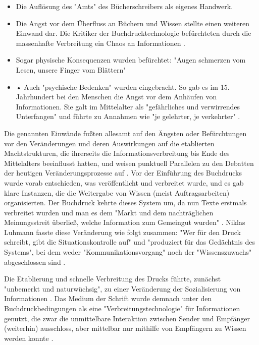 \begin{itemize}
\item Die Auflösung des "Amts" des Bücherschreibers als eigenes Handwerk.
\item Die Angst vor dem Überfluss an Büchern und Wissen stellte einen weiteren Einwand dar. Die Kritiker der Buchdrucktechnologie befürchteten  durch die massenhafte Verbreitung ein Chaos an Informationen \cite{giesecke_1991_buchdruck}.
\item Sogar physische Konsequenzen wurden befürchtet: "Augen schmerzen vom Lesen, unsere Finger vom Blättern" \cite{giesecke_1991_buchdruck}
\item •	Auch "psychische Bedenken" wurden eingebracht. So gab es im 15. Jahrhundert bei den Menschen die Angst vor dem Anhäufen von Informationen. Sie galt im Mittelalter als "gefährliches und verwirrendes Unterfangen" und führte zu Annahmen wie "je gelehrter, je verkehrter" \cite{giesecke_1991_buchdruck}.
\end{itemize}

Die genannten Einwände fußten allesamt auf den Ängsten oder Befürchtungen vor den Veränderungen und deren Auswirkungen auf die etablierten Machtstrukturen, die ihrerseits die Informationsverbreitung bis Ende des Mittelalters beeinflusst hatten, und weisen punktuell Parallelen zu den Debatten der heutigen Veränderungsprozesse auf \cite{hagner_2015_sache_buches}. Vor der Einführung des Buchdrucks wurde vorab entschieden, was veröffentlicht und verbreitet wurde, und es gab klare Instanzen, die die Weitergabe von Wissen (meist Auftragsarbeiten) organisierten. Der Buchdruck kehrte dieses System um, da nun Texte erstmals verbreitet wurden und man es dem "Markt und dem nachträglichen Meinungsstreit überließ, welche Information zum Gemeingut wurden" \cite{giesecke_1991_buchdruck}. Niklas Luhmann fasste diese Veränderung wie folgt zusammen: "Wer für den Druck schreibt, gibt die Situationskontrolle auf" und "produziert für das Gedächtnis des Systems", bei dem weder "Kommunikationsvorgang" noch der "Wissenszuwachs" abgeschlossen sind \cite{Luhmann1998}.

Die Etablierung und schnelle Verbreitung \cite{stober_2014_pressegeschichte} des Drucks führte, zunächst "unbemerkt und naturwüchsig", zu einer Veränderung der Sozialisierung von Informationen \cite{giesecke_1991_buchdruck}. Das Medium der Schrift wurde demnach unter den Buchdruckbedingungen als eine "Verbreitungstechnologie" für Informationen genutzt, die zwar die unmittelbare Interaktion zwischen Sender und Empfänger (weiterhin) ausschloss, aber mittelbar nur mithilfe von Empfängern zu Wissen werden konnte \cite{Luhmann1998}.

